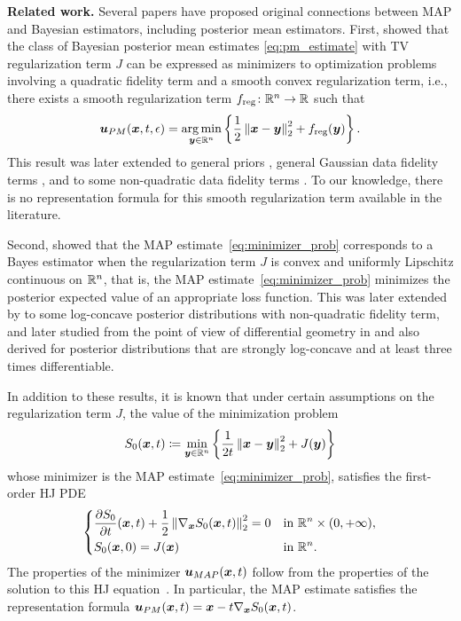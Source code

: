 \bigbreak
\noindent
\textbf{Related work.} 
Several papers have proposed original connections between MAP and Bayesian estimators, including posterior mean estimators. First, \cite{louchet2008modeles,louchet2013posterior} showed that the class of Bayesian posterior mean estimates \eqref{eq:pm_estimate} with TV regularization term $J$ can be expressed as minimizers to optimization problems involving a quadratic fidelity term and a smooth convex regularization term, i.e., there exists a smooth regularization term $f_{\rm{reg}}\colon \mathbb{R}^n \to \mathbb{R}$ such that
\begin{equation}\label{eq:pm_rep_map}
\boldsymbol{u}_{PM}(\boldsymbol{x},t,\epsilon) = \operatorname*{arg\,min}_{\boldsymbol{y} \in \mathbb{R}^n} \left\{\frac{1}{2}\left\Vert{\boldsymbol{x}-\boldsymbol{y}} \right\Vert_{2}^{2} + f_{\rm{reg}}(\boldsymbol{y})\right\}.
\end{equation}
This result was later extended to general priors \cite{gribonval2011should}, general Gaussian data fidelity terms \cite{gribonval2013reconciling}, and to some non-quadratic data fidelity terms \cite{gribonval2018bayesian,gribonval2018characterization}. To our knowledge, there is no representation formula for this smooth regularization term available in the literature. 

Second, \cite{burger2014maximum} showed that the MAP estimate~\eqref{eq:minimizer_prob} corresponds to a Bayes estimator when the regularization term $J$ is convex and uniformly Lipschitz continuous on $\mathbb{R}^n$, that is, the MAP estimate~\eqref{eq:minimizer_prob} minimizes the posterior expected value of an appropriate loss function. This was later extended by \cite{burger2016bregman} to some log-concave posterior distributions with non-quadratic fidelity term, and later studied from the point of view of differential geometry in \cite{pereyra2019revisiting} and also derived for posterior distributions that are strongly log-concave and at least three times differentiable.

In addition to these results, it is known that under certain assumptions on the regularization term $J$, the value of the minimization problem
\begin{equation} \label{eq:minimization_prob} 
S_{0}(\boldsymbol{x},t)\coloneqq\min_{\boldsymbol{y}\in\mathbb{R}^n}\left\{ \frac{1}{2t}\left\Vert{\boldsymbol{x}-\boldsymbol{y}} \right\Vert_{2}^{2}+J(\boldsymbol{y})\right\}
\end{equation}
whose minimizer is the MAP estimate~\eqref{eq:minimizer_prob}, satisfies the first-order HJ PDE 
\begin{equation}
\begin{dcases}
\frac{\partial S_0}{\partial t}(\boldsymbol{x},t)+\frac{1}{2}\left\Vert{\nabla_{\boldsymbol{x}}S_0(\boldsymbol{x},t)} \right\Vert_{2}^{2}=0 & \mbox{in }\mathbb{R}^n\times(0,+\infty),\\
S_0(\boldsymbol{x},0)=J(\boldsymbol{x}) & \mbox{in }\mathbb{R}^n.
\end{dcases}
\end{equation}
The properties of the minimizer $\boldsymbol{u}_{MAP}(\boldsymbol{x},t)$ follow from the properties of the solution to this HJ equation~\cite{darbon2015convex,darbon2019decomposition}. In particular, the MAP estimate satisfies the representation formula $\boldsymbol{u}_{PM}(\boldsymbol{x},t) = \boldsymbol{x} - t\nabla_{\boldsymbol{x}}S_0(\boldsymbol{x},t)$. 

